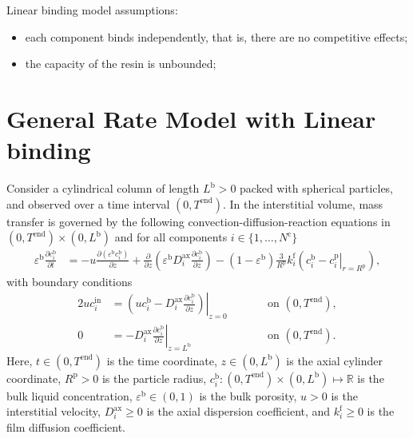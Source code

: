 \documentclass{article}
\begin{document}
Linear binding model assumptions:
\begin{itemize}
    \item each component binds independently, that is, there are no competitive effects;
    \item the capacity of the resin is unbounded;
\end{itemize}

\section*{General Rate Model with Linear binding}
Consider a cylindrical column of length $L^{\mathrm{b}} > 0$ packed with spherical particles, and observed over a time interval $(0, T^{\mathrm{end}})$.
In the interstitial volume, mass transfer is governed by the following convection-diffusion-reaction equations in $(0, T^{\mathrm{end}})\times (0, L^{\mathrm{b}})$ and for all components $i\in\{1, \dots, N^{\mathrm{c}} \}$
\begin{align}
    \varepsilon^{\mathrm{b}} \frac{\partial c^{\mathrm{b}}_{i}}{\partial t}
    &= - u \frac{\partial \left( \varepsilon^{\mathrm{b}} c^{\mathrm{b}}_{i} \right)}{\partial z}
        + \frac{\partial}{\partial z} \left( \varepsilon^{\mathrm{b}} D^{\mathrm{ax}}_{i} \frac{\partial c^{\mathrm{b}}_{i}}{\partial z} \right)
        - \left(1 - \varepsilon^{\mathrm{b}} \right) \frac{3}{R^{\mathrm{p}}} k^{\mathrm{f}}_{i} \left(c^{\mathrm{b}}_{i} - \left. c^{\mathrm{p}}_{i} \right|_{r = R^{\mathrm{p}}} \right),
\end{align}
with boundary conditions
\begin{alignat}{2}
    u c^{\mathrm{in}}_{i}
    &= \left.\left( u c^{\mathrm{b}}_{i} - D^{\mathrm{ax}}_{i} \frac{\partial c^{\mathrm{b}}_{i}}{\partial z}\right)\right|_{z=0}
    & & \qquad\text{on }(0, T^{\mathrm{end}}),
    \\
    0
    &= - D^{\mathrm{ax}}_{i} \left. \frac{\partial c^{\mathrm{b}}_{i}}{\partial z} \right|_{z=L^{\mathrm{b}}}
    & & \qquad\text{on }(0, T^{\mathrm{end}}).
\end{alignat}
Here, $t\in (0, T^{\mathrm{end}})$ is the time coordinate, $z\in (0, L^{\mathrm{b}})$ is the axial cylinder coordinate, $R^{\mathrm{p}}> 0$ is the particle radius, $c^{\mathrm{b}}_{i}\colon (0, T^{\mathrm{end}})\times (0, L^{\mathrm{b}}) \mapsto \mathbb{R}$ is the bulk liquid concentration, $\varepsilon^{\mathrm{b}}\in (0, 1)$ is the bulk porosity, $u> 0$ is the interstitial velocity, $D^{\mathrm{ax}}_{i}\geq 0$ is the axial dispersion coefficient, and $k^{\mathrm{f}}_{i}\geq 0$ is the film diffusion coefficient.
\end{document}
